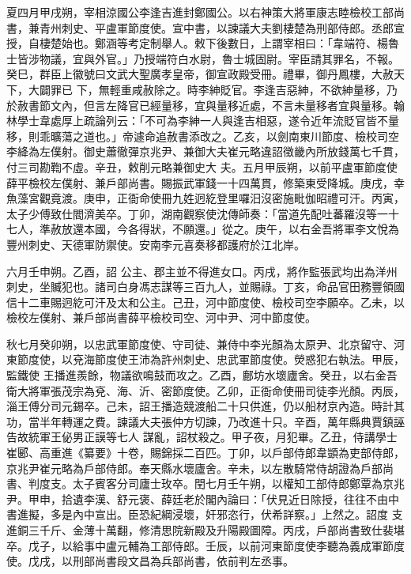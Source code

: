 \begin{pinyinscope}
 夏四月甲戌朔，宰相涼國公李逢吉進封鄭國公。以右神策大將軍康志睦檢校工部尚書，兼青州刺史、平盧軍節度使。宣中書，以諫議大夫劉棲楚為刑部侍郎。丞郎宣授，自棲楚始也。鄭涵等考定制舉人。敕下後數日，上謂宰相曰：「韋端符、楊魯士皆涉物議，宜與外官。」乃授端符白水尉，魯士城固尉。宰臣請其罪名，不報。癸巳，群臣上徽號曰文武大聖廣孝皇帝，御宣政殿受冊。禮畢，御丹鳳樓，大赦天下，大闢罪已
 下，無輕重咸赦除之。時李紳貶官。李逢吉惡紳，不欲紳量移，乃於赦書節文內，但言左降官已經量移，宜與量移近處，不言未量移者宜與量移。翰林學士韋處厚上疏論列云：「不可為李紳一人與逢吉相惡，遂令近年流貶官皆不量移，則乖曠蕩之道也。」帝遽命追赦書添改之。乙亥，以劍南東川節度、檢校司空李絳為左僕射。御史蕭徹彈京兆尹、兼御大夫崔元略違詔徵畿內所放錢萬七千貫，付三司勘鞫不虛。辛丑，敕削元略兼御史大
 夫。五月甲辰朔，以前平盧軍節度使薛平檢校左僕射、兼戶部尚書。賜振武軍錢一十四萬貫，修築東受降城。庚戌，幸魚藻宮觀竟渡。庚申，正衙命使冊九姓迥紇登里囉汨沒密施毗伽昭禮可汗。丙寅，太子少傅致仕閻濟美卒。丁卯，湖南觀察使沈傳師奏：「當道先配吐蕃羅沒等一十七人，準赦放還本國，今各得狀，不願還。」從之。庚午，以右金吾將軍李文悅為豐州刺史、天德軍防禦使。安南李元喜奏移都護府於江北岸。



 六月壬申朔。乙酉，詔
 公主、郡主並不得進女口。丙戌，將作監張武均出為洋州刺史，坐贓犯也。諸司白身馮志謀等三百九人，並賜祿。丁亥，命品官田務豐領國信十二車賜迥紇可汗及太和公主。己丑，河中節度使、檢校司空李願卒。乙未，以檢校左僕射、兼戶部尚書薛平檢校司空、河中尹、河中節度使。



 秋七月癸卯朔，以忠武軍節度使、守司徒、兼侍中李光顏為太原尹、北京留守、河東節度使，以兗海節度使王沛為許州刺史、忠武軍節度使。熒惑犯右執法。甲辰，監鐵使
 王播進羨餘，物議欲鳴鼓而攻之。乙酉，鄜坊水壞廬舍。癸丑，以右金吾衛大將軍張茂宗為兗、海、沂、密節度使。乙卯，正衙命使冊司徒李光顏。丙辰，淄王傅分司元錫卒。己未，詔王播造競渡船二十只供進，仍以船材京內造。時計其功，當半年轉運之費。諫議大夫張仲方切諫，乃改進十只。辛酉，萬年縣典賈鎮誣告故統軍王佖男正謨等七人
 謀亂，詔杖殺之。甲子夜，月犯畢。乙丑，侍講學士崔郾、高重進《纂要》十卷，賜錦採二百匹。丁卯，以戶部侍郎韋顗為吏部侍郎，京兆尹崔元略為戶部侍郎。奉天縣水壞廬舍。辛未，以左散騎常侍胡證為戶部尚書、判度支。太子賓客分司廬士玫卒。閏七月壬午朔，以權知工部侍郎鄭覃為京兆尹。甲申，拾遺李漢、舒元褒、薛廷老於閣內論曰：「伏見近日除授，往往不由中書進擬，多是內中宣出。臣恐紀綱浸壞，奸邪恣行，伏希詳察。」上然之。詔度
 支進銅三千斤、金薄十萬翻，修清思院新殿及升陽殿圖障。丙戌，戶部尚書致仕裴堪卒。戊子，以給事中盧元輔為工部侍郎。壬辰，以前河東節度使李聽為義成軍節度使。戊戌，以刑部尚書段文昌為兵部尚書，依前判左丞事。




\end{pinyinscope}
